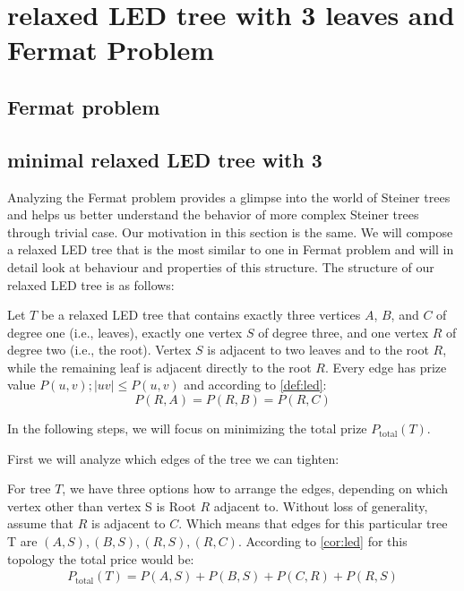 \documentclass[12pt]{article}
\newcommand{\Prize}[2]{P(#1,#2)}
\newcommand{\Ptotal}[1]{P_{\text{total}}(#1)}
\begin{document}
	\section*{relaxed LED tree with 3 leaves and Fermat Problem}
	
	
	 
	\subsection{Fermat problem}
	
	
	
	\subsection{minimal relaxed LED tree with 3}
	
	Analyzing the Fermat problem provides a glimpse into the world of Steiner trees and helps us better understand the behavior of more complex Steiner trees through trivial case. Our motivation in this section is the same. We will compose a relaxed LED tree that is the most similar to one in Fermat problem and will in detail look at behaviour and properties of this structure. The structure of our relaxed LED tree is as follows:
	
	Let \( T \) be a relaxed LED tree that contains exactly three vertices \( A \), \( B \), and \( C \) of degree one (i.e., leaves), exactly one vertex \( S \) of degree three, and one vertex \( R \) of degree two (i.e., the root). Vertex \( S \) is adjacent to two leaves and to the root \( R \), while the remaining leaf is adjacent directly to the root \( R \). Every edge has prize value \(\Prize{u}{v}; |uv| \leq \Prize{u}{v} \) and according to \cref{def:led}: 
	\[
	\Prize{R}{A} = \Prize{R}{B} = \Prize{R}{C}
	\] 
	
	In the following steps, we will focus on minimizing the total prize \(\Ptotal{T}\).
	
	First we will analyze which edges of the tree we can tighten:
	
	For tree \( T \), we have three options how to arrange the edges, depending on which vertex other than vertex S is Root \( R \) adjacent to. Without loss of generality, assume that \(R\) is adjacent to \(C\). Which means that edges for this particular tree T are \((A,S),(B,S),(R,S),(R,C)\). According to  \cref{cor:led} for this topology the total price would be:
	 \begin{align*}
	 	\Ptotal{T} = \Prize{A}{S} + \Prize{B}{S} + \Prize{C}{R} + \Prize{R}{S}
	 \end{align*}
	 
\end{document}

